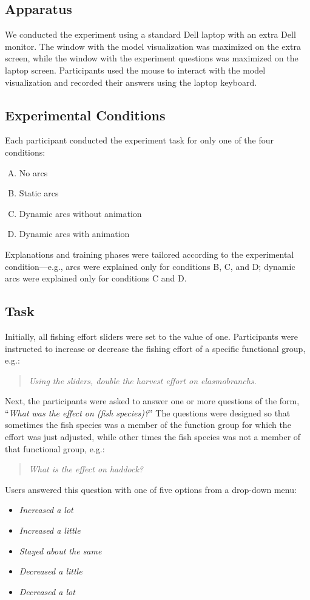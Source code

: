 \subsection{Apparatus}

We conducted the experiment using a standard Dell laptop with an extra Dell monitor.  The window with the model visualization was maximized on the extra screen, while the window with the experiment questions was maximized on the laptop screen.  Participants used the mouse to interact with the model visualization and recorded their answers using the laptop keyboard.

\subsection{Experimental Conditions}

Each participant conducted the experiment task for only one of the four conditions:

\begin{enumerate}[(A)]
\item No arcs
\item Static arcs
\item Dynamic arcs without animation
\item Dynamic arcs with animation
\end{enumerate}

Explanations and training phases were tailored according to the experimental condition---e.g., arcs were explained only for conditions B, C, and D; dynamic arcs were explained only for conditions C and D.

\subsection{Task}

Initially, all fishing effort sliders were set to the value of one.  Participants were  instructed to increase or decrease the fishing effort of a specific functional group, e.g.:
\begin{quote}
\textit{Using the sliders, double the harvest effort on elasmobranchs.}
\end{quote}

Next, the participants were asked to answer one or more questions of the form, ``\textit{What was the effect on (fish species)?}''  The questions were designed so that sometimes the fish species was a member of the function group for which the effort was just adjusted, while other times the fish species was not a member of that functional group, e.g.:
\begin{quote}
\textit{What is the effect on haddock?}
\end{quote}
Users answered this question with one of five options from a drop-down menu:
\begin{itemize}
\item \textit{Increased a lot}
\item \textit{Increased a little}
\item \textit{Stayed about the same}
\item \textit{Decreased a little}
\item \textit{Decreased a lot}
\end{itemize}


